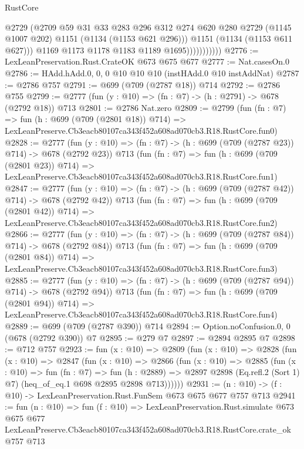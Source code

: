\begin{lexlean}{RustCore}
\begin{coremodule}
                            @2729
                            (@2709
                              @59
                              @31
                              @33
                              @283
                              @296
                              @312
                              @274
                              @620
                              @280
                              @2729
                              (@1145 @1007 @202)
                              @1151
                              (@1134 (@1153 @621 @296)))
                            @1151
                            (@1134 (@1153 @611 @627)))
                          @1169
                          @1173
                          @1178
                          @1183
                          @1189
                          @1695)))))))))))
@2776 := LexLeanPreservation.Rust.CrateOK @673 @675 @677
@2777 := Nat.casesOn.{0}
@2786 := HAdd.hAdd.{0, 0, 0} @10 @10 @10 (instHAdd.{0} @10 instAddNat)
@2787 := @2786 @757
@2791 := @699 (@709 (@2787 @18)) @714
@2792 := @2786 @755
@2799 := @2777 (fun (y : @10) => (fn : @7) -> (h : @2791) -> @678 (@2792 @18)) @713
@2801 := @2786 Nat.zero
@2809 := @2799
    (fun (fn : @7) =>
    fun (h : @699 (@709 (@2801 @18)) @714) =>
    LexLeanPreserve.Cb3eacb80107ca343f452a608ad070cb3.R18.RustCore.fun0)
@2828 := @2777
    (fun (y : @10) => (fn : @7) -> (h : @699 (@709 (@2787 @23)) @714) -> @678 (@2792 @23))
    @713
    (fun (fn : @7) =>
    fun (h : @699 (@709 (@2801 @23)) @714) =>
    LexLeanPreserve.Cb3eacb80107ca343f452a608ad070cb3.R18.RustCore.fun1)
@2847 := @2777
    (fun (y : @10) => (fn : @7) -> (h : @699 (@709 (@2787 @42)) @714) -> @678 (@2792 @42))
    @713
    (fun (fn : @7) =>
    fun (h : @699 (@709 (@2801 @42)) @714) =>
    LexLeanPreserve.Cb3eacb80107ca343f452a608ad070cb3.R18.RustCore.fun2)
@2866 := @2777
    (fun (y : @10) => (fn : @7) -> (h : @699 (@709 (@2787 @84)) @714) -> @678 (@2792 @84))
    @713
    (fun (fn : @7) =>
    fun (h : @699 (@709 (@2801 @84)) @714) =>
    LexLeanPreserve.Cb3eacb80107ca343f452a608ad070cb3.R18.RustCore.fun3)
@2885 := @2777
    (fun (y : @10) => (fn : @7) -> (h : @699 (@709 (@2787 @94)) @714) -> @678 (@2792 @94))
    @713
    (fun (fn : @7) =>
    fun (h : @699 (@709 (@2801 @94)) @714) =>
    LexLeanPreserve.Cb3eacb80107ca343f452a608ad070cb3.R18.RustCore.fun4)
@2889 := @699 (@709 (@2787 @390)) @714
@2894 := Option.noConfusion.{0, 0} (@678 (@2792 @390)) @7
@2895 := @279 @7
@2897 := @2894 @2895 @7
@2898 := @712 @757
@2923 := fun (x : @10) =>
  @2809
    (fun (x : @10) =>
    @2828
      (fun (x : @10) =>
      @2847
        (fun (x : @10) =>
        @2866
          (fun (x : @10) =>
          @2885
            (fun (x : @10) =>
            fun (fn : @7) =>
            fun (h : @2889) =>
            @2897 @2898 (Eq.refl.{2} (Sort 1) @7) (heq_of_eq.{1} @698 @2895 @2898 @713))))))
@2931 := (n : @10) -> (f : @10) -> LexLeanPreservation.Rust.FunSem @673 @675 @677 @757 @713
@2941 := fun (n : @10) =>
  fun (f : @10) =>
  LexLeanPreservation.Rust.simulate
    @673
    @675
    @677
    LexLeanPreserve.Cb3eacb80107ca343f452a608ad070cb3.R18.RustCore.crate_ok
    @757
    @713
\end{coremodule}
\end{lexlean}
